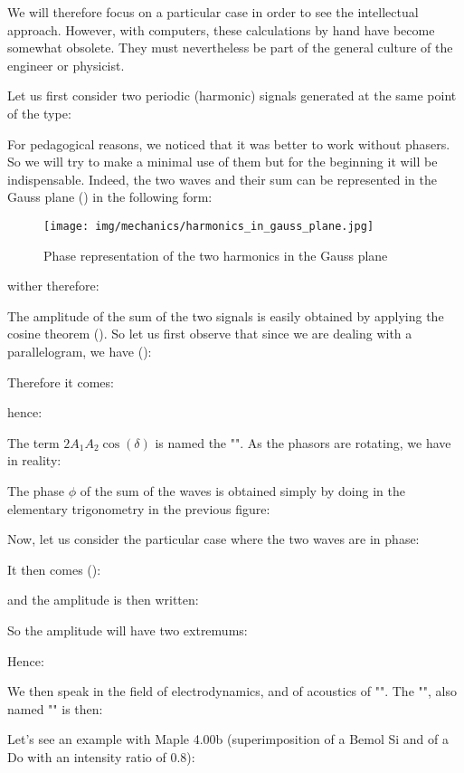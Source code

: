 	We will therefore focus on a particular case in order to see the intellectual approach. However, with computers, these calculations by hand have become somewhat obsolete. They must nevertheless be part of the general culture of the engineer or physicist.
	
	Let us first consider two periodic (harmonic) signals generated at the same point of the type:
	
	For pedagogical reasons, we noticed that it was better to work without phasers. So we will try to make a minimal use of them but for the beginning it will be indispensable. Indeed, the two waves and their sum can be represented in the Gauss plane () in the following form:
	\begin{figure}[H]
		\centering
		\texttt{[image: img/mechanics/harmonics\_in\_gauss\_plane.jpg]}
		\caption{Phase representation of the two harmonics in the Gauss plane}
	\end{figure}
	wither therefore:
	
	The amplitude of the sum of the two signals is easily obtained by applying the cosine theorem (). So let us first observe that since we are dealing with a parallelogram, we have ():
	
	Therefore it comes:
	
	hence:
	
	The term $2A_1A_2\cos(\delta)$ is named the "". As the phasors are rotating, we have in reality:
	
	The phase $\phi$ of the sum of the waves is obtained simply by doing in the elementary trigonometry in the previous figure:
	
	Now, let us consider the particular case where the two waves are in phase:
	
	It then comes ():
	
	and the amplitude is then written:
	
	So the amplitude will have two extremums:
	
	Hence:
	
	We then speak in the field of electrodynamics, and of acoustics of "". The "", also named "" is then:
	
	Let's see an example with Maple 4.00b (superimposition of a Bemol Si and of a Do with an intensity ratio of $0.8$):
	
